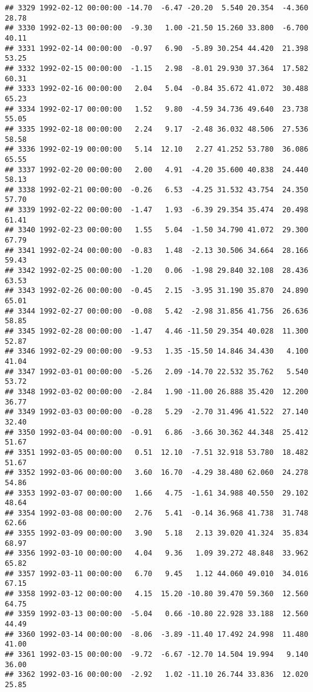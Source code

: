 \documentclass{article}\usepackage{graphicx, color}
\makeatletter
\newenvironment{kframe}{%
 \def\at@end@of@kframe{}%
 \ifinner\ifhmode%
  \def\at@end@of@kframe{\end{minipage}}%
  \begin{minipage}{\columnwidth}%
 \fi\fi%
 \def\FrameCommand##1{\hskip\@totalleftmargin \hskip-\fboxsep
 \colorbox{shadecolor}{##1}\hskip-\fboxsep
     \hskip-\linewidth \hskip-\@totalleftmargin \hskip\columnwidth}%
 \MakeFramed {\advance\hsize-\width
   \@totalleftmargin\z@ \linewidth\hsize
   \@setminipage}}%
 {\par\unskip\endMakeFramed%
 \at@end@of@kframe}
\newenvironment{knitrout}{}{} %
\makeatother
\begin{document}
\begin{knitrout}
\begin{kframe}
\begin{verbatim}
## 3329 1992-02-12 00:00:00 -14.70  -6.47 -20.20  5.540 20.354  -4.360  28.78
## 3330 1992-02-13 00:00:00  -9.30   1.00 -21.50 15.260 33.800  -6.700  40.11
## 3331 1992-02-14 00:00:00  -0.97   6.90  -5.89 30.254 44.420  21.398  53.25
## 3332 1992-02-15 00:00:00  -1.15   2.98  -8.01 29.930 37.364  17.582  60.31
## 3333 1992-02-16 00:00:00   2.04   5.04  -0.84 35.672 41.072  30.488  65.23
## 3334 1992-02-17 00:00:00   1.52   9.80  -4.59 34.736 49.640  23.738  55.05
## 3335 1992-02-18 00:00:00   2.24   9.17  -2.48 36.032 48.506  27.536  58.58
## 3336 1992-02-19 00:00:00   5.14  12.10   2.27 41.252 53.780  36.086  65.55
## 3337 1992-02-20 00:00:00   2.00   4.91  -4.20 35.600 40.838  24.440  58.13
## 3338 1992-02-21 00:00:00  -0.26   6.53  -4.25 31.532 43.754  24.350  57.70
## 3339 1992-02-22 00:00:00  -1.47   1.93  -6.39 29.354 35.474  20.498  61.41
## 3340 1992-02-23 00:00:00   1.55   5.04  -1.50 34.790 41.072  29.300  67.79
## 3341 1992-02-24 00:00:00  -0.83   1.48  -2.13 30.506 34.664  28.166  59.43
## 3342 1992-02-25 00:00:00  -1.20   0.06  -1.98 29.840 32.108  28.436  63.53
## 3343 1992-02-26 00:00:00  -0.45   2.15  -3.95 31.190 35.870  24.890  65.01
## 3344 1992-02-27 00:00:00  -0.08   5.42  -2.98 31.856 41.756  26.636  58.85
## 3345 1992-02-28 00:00:00  -1.47   4.46 -11.50 29.354 40.028  11.300  52.87
## 3346 1992-02-29 00:00:00  -9.53   1.35 -15.50 14.846 34.430   4.100  41.04
## 3347 1992-03-01 00:00:00  -5.26   2.09 -14.70 22.532 35.762   5.540  53.72
## 3348 1992-03-02 00:00:00  -2.84   1.90 -11.00 26.888 35.420  12.200  36.77
## 3349 1992-03-03 00:00:00  -0.28   5.29  -2.70 31.496 41.522  27.140  32.40
## 3350 1992-03-04 00:00:00  -0.91   6.86  -3.66 30.362 44.348  25.412  51.67
## 3351 1992-03-05 00:00:00   0.51  12.10  -7.51 32.918 53.780  18.482  51.67
## 3352 1992-03-06 00:00:00   3.60  16.70  -4.29 38.480 62.060  24.278  54.86
## 3353 1992-03-07 00:00:00   1.66   4.75  -1.61 34.988 40.550  29.102  48.64
## 3354 1992-03-08 00:00:00   2.76   5.41  -0.14 36.968 41.738  31.748  62.66
## 3355 1992-03-09 00:00:00   3.90   5.18   2.13 39.020 41.324  35.834  68.97
## 3356 1992-03-10 00:00:00   4.04   9.36   1.09 39.272 48.848  33.962  65.82
## 3357 1992-03-11 00:00:00   6.70   9.45   1.12 44.060 49.010  34.016  67.15
## 3358 1992-03-12 00:00:00   4.15  15.20 -10.80 39.470 59.360  12.560  64.75
## 3359 1992-03-13 00:00:00  -5.04   0.66 -10.80 22.928 33.188  12.560  44.49
## 3360 1992-03-14 00:00:00  -8.06  -3.89 -11.40 17.492 24.998  11.480  41.00
## 3361 1992-03-15 00:00:00  -9.72  -6.67 -12.70 14.504 19.994   9.140  36.00
## 3362 1992-03-16 00:00:00  -2.92   1.02 -11.10 26.744 33.836  12.020  25.85

\end{verbatim}
\end{kframe}
\end{knitrout}
\end{document}
